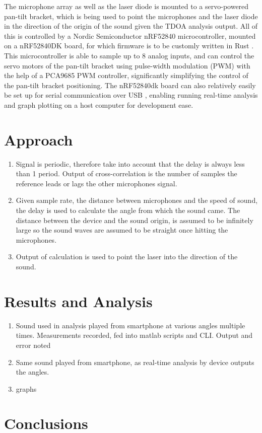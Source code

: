 \documentclass[a4paper]{article}
\begin{document}
The microphone array as well as the laser diode is mounted to a servo-powered pan-tilt bracket, which is being used to point the microphones and the laser diode in the direction of the origin of the sound given the TDOA analysis output. All of this is controlled by a Nordic Semiconductor nRF52840 microcontroller, mounted on a nRF52840DK board, for which firmware is to be customly written in Rust \cite{rust}. This microcontroller is able to sample up to 8 analog inputs, and can control the servo motors of the pan-tilt bracket using pulse-width modulation (PWM) \cite{GULYAEV20161529} with the help of a PCA9685 \cite{pca9685} PWM controller, significantly simplifying the control of the pan-tilt bracket positioning. The nRF52840dk board can also relatively easily be set up for serial communication over USB \cite{usb}, enabling running real-time analysis and graph plotting on a host computer for development ease.


\section{Approach}

\begin{enumerate}
    \item Signal is periodic, therefore take into account that the delay is always less than 1 period. Output of cross-correlation is the number of samples the reference leads or lags the other microphones signal.
    \item Given sample rate, the distance between microphones and the speed of sound, the delay is used to calculate the angle from which the sound came. The distance between the device and the sound origin, is assumed to be infinitely large so the sound waves are assumed to be straight once hitting the microphones.
    \item Output of calculation is used to point the laser into the direction of the sound.
\end{enumerate}

\section{Results and Analysis}
\begin{enumerate}

    \item Sound used in analysis played from smartphone at various angles multiple times. Measurements recorded, fed into matlab scripts and CLI. Output and error noted
    \item Same sound played from smartphone, as real-time analysis by device outputs the angles.
    \item graphs
\end{enumerate}

\section{Conclusions}




\end{document}
